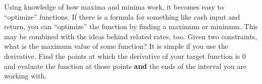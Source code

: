 \documentclass[../revisedmain.tex]{subfiles}
\begin{document}
	Using knowledge of how maxima and minima work, it becomes easy to ``optimize'' functions. If there is a formula for something like cash input and return, you can ``optimize'' the function by finding a maximum or minimum. This may be combined with the ideas behind related rates, too. Given two constraints, what is the maximum value of some function? It is simple if you use the derivative. Find the points at which the derivative of your target function is 0 and evaluate the function at those points \textbf{and} the ends of the interval you are working with.\\
\end{document}
